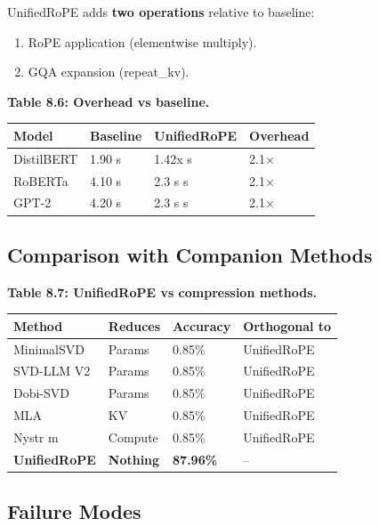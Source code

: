 UnifiedRoPE adds \textbf{two operations} relative to baseline:
\begin{enumerate}
\item RoPE application (elementwise multiply).
\item GQA expansion (repeat\_kv).

\end{enumerate}
\textbf{Table 8.6: Overhead vs baseline.}

\begin{table}[H]
\centering
\small
\begin{tabular}{llll}
\toprule
\textbf{Model} & \textbf{Baseline} & \textbf{UnifiedRoPE} & \textbf{Overhead} \\
\midrule
DistilBERT & 1.90 s & 1.42x s & 2.1$\times$ \\
RoBERTa & 4.10 s & 2.3 s s & 2.1$\times$ \\
GPT-2 & 4.20 s & 2.3 s s & 2.1$\times$ \\
\bottomrule
\end{tabular}
\end{table}

\subsection{Comparison with Companion Methods}

\textbf{Table 8.7: UnifiedRoPE vs compression methods.}

\begin{table}[H]
\centering
\small
\begin{tabular}{llll}
\toprule
\textbf{Method} & \textbf{Reduces} & \textbf{Accuracy} & \textbf{Orthogonal to} \\
\midrule
MinimalSVD & Params & 0.85\% & UnifiedRoPE \\
SVD-LLM V2 & Params & 0.85\% & UnifiedRoPE \\
Dobi-SVD & Params & 0.85\% & UnifiedRoPE \\
MLA & KV & 0.85\% & UnifiedRoPE \\
Nystr m & Compute & 0.85\% & UnifiedRoPE \\
\textbf{UnifiedRoPE} & \textbf{Nothing} & \textbf{87.96\%} & -- \\
\bottomrule
\end{tabular}
\end{table}

\subsection{Failure Modes}

